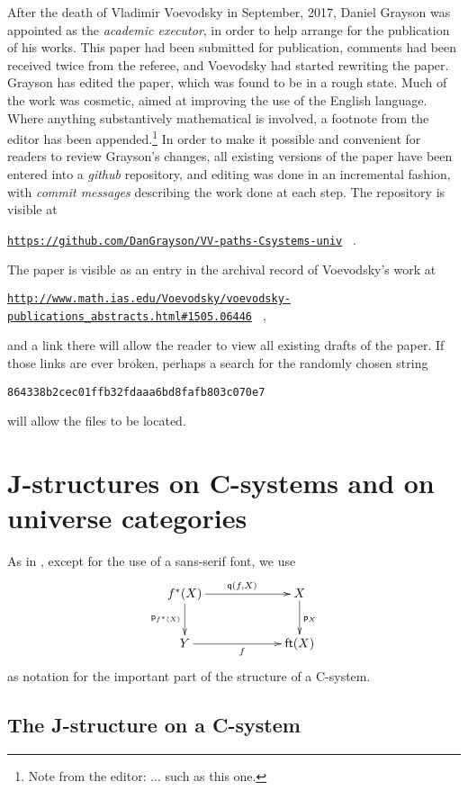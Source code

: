 \documentclass[12pt]{article}
\numberwithin{equation}{section}
\newcommand{\ft}{\mathsf{ft}}
\newcommand{\p}{\mathsf{p}}
\newcommand{\q}{\mathsf{q}}
\begin{document}
\newcommand{\editorfootnote}[1]{\footnote{Note from the editor: #1}}

After the death of Vladimir Voevodsky in September, 2017, Daniel Grayson was
appointed as the {\em academic executor}, in order to help arrange for the
publication of his works.  This paper had been submitted for publication,
comments had been received twice from the referee, and Voevodsky had started
rewriting the paper.
Grayson has edited the paper, which was found
to be in a rough state.  Much of the work was cosmetic, aimed at improving the
use of the English language.  Where anything substantively mathematical is
involved, a footnote from the editor has been appended.\editorfootnote{... such
  as this one.}
In order to make it possible and convenient for readers to review Grayson's
changes, all existing versions of the paper have been entered into a {\em github}
repository, and editing was done in an incremental fashion, with {\em commit
  messages} describing the work done at each step.  The repository is visible
at
\hfill\break\centerline{\tiny{\tt \href{https://github.com/DanGrayson/VV-paths-Csystems-univ}{https://github.com/DanGrayson/VV-paths-Csystems-univ}%
  } .}
The paper is visible as an entry in the archival record of Voevodsky's work at
\hfill\break\centerline{\tiny{\tt \href{http://www.math.ias.edu/Voevodsky/voevodsky-publications\_abstracts.html\#1505.06446}{http://www.math.ias.edu/Voevodsky/voevodsky-publications\_abstracts.html\#1505.06446}%
  } ,}
and a link there will allow the reader to view all existing drafts of the paper.
If those links are ever broken, perhaps a search for the randomly chosen string
\hfill\break\centerline{{\tt 864338b2cec01ffb32fdaaa6bd8fafb803c070e7}}
will allow the files to be located.

\section{J-structures on C-systems and on universe categories}


As in \cite{Csubsystems}, except for the use of a sans-serif font, we use
$$
  \xymatrix@C=5pc{
    f^*(X) \ar[r]^{\q(f,X)} \ar[d]_{\p_{f^*(X)}}  & X \ar[d]^{\p_X} \\
    Y \ar[r]_f & \ft(X)
  }
$$
as notation for the important part of the structure of a C-system.


\subsection{The J-structure on a C-system}
%
\end{document}
